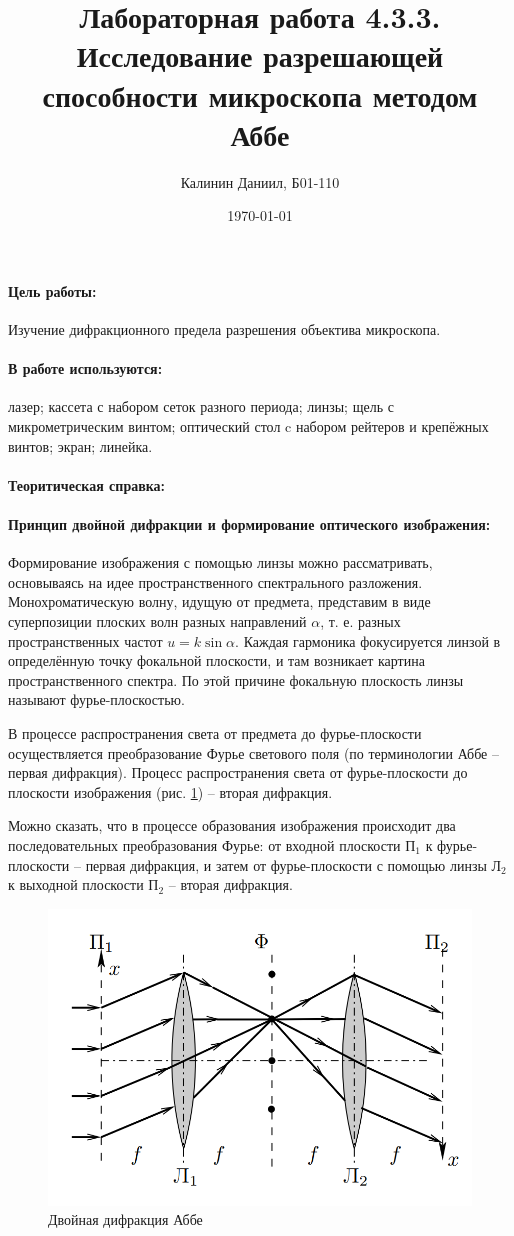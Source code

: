 \documentclass[a4paper, 12pt]{article}
\author{Калинин Даниил, Б01-110}
\date{\today}
\title{Лабораторная работа 4.3.3. Исследование разрешающей способности микроскопа методом Аббе}
\newcommand{\parag}[1]{\paragraph*{#1:}}
\begin{document}
\maketitle
\parindent=0cm

\parag {Цель работы}
Изучение дифракционного предела разрешения объектива микроскопа.

\parag {В работе используются}
лазер; кассета с набором сеток разного
периода; линзы; щель с микрометрическим винтом; оптический стол
c набором рейтеров и крепёжных винтов; экран; линейка.

\parag {Теоритическая справка}

\parag{Принцип двойной дифракции и формирование оптического	изображения}

Формирование изображения с помощью линзы можно рассматривать, основываясь на идее пространственного спектрального разложения. Монохроматическую волну, идущую от предмета, представим в виде суперпозиции плоских волн разных направлений $ \alpha $, т. е. разных пространственных частот $ u = k \sin \alpha $. Каждая гармоника фокусируется линзой в определённую точку фокальной плоскости, и там возникает картина пространственного спектра. По этой причине фокальную плоскость линзы называют фурье-плоскостью.

В процессе распространения света от предмета до фурье-плоскости осуществляется преобразование Фурье светового поля (по терминологии Аббе -- первая дифракция). Процесс распространения света от фурье-плоскости до плоскости изображения (рис. \ref{fig:screenshot1}) -- вторая дифракция.

Можно сказать, что в процессе образования изображения происходит два последовательных преобразования Фурье: от входной плоскости $ П_1 $ к фурье-плоскости -- первая дифракция, и затем от фурье-плоскости с помощью линзы $ Л_2 $ к выходной плоскости $ П_2 $ -- вторая дифракция.

\begin{figure}[tbp]
	\centering
	\includegraphics[width=0.8\linewidth]{Screenshot_1}
	\caption{Двойная дифракция Аббе}
	\label{fig:screenshot1}
\end{figure}
\end{document}
